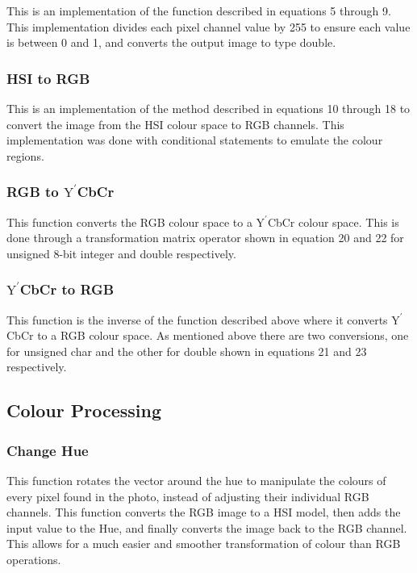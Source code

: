 \documentclass{article}
\begin{document}
	This is an implementation of the function described in equations 5 through 9. This implementation divides each pixel channel value by 255 to ensure each value is between 0 and 1, and converts the output image to type double.

	\subsubsection{HSI to RGB}
		
	This is an implementation of the method described in equations 10 through 18 to convert the image from the HSI colour space to RGB channels. This implementation was done with conditional statements to emulate the colour regions.\\
	
	\subsubsection{RGB to $\textrm{Y}^\prime$CbCr}
	
	This function converts the RGB colour space to a $\textrm{Y}^\prime$CbCr colour space. This is done through a transformation matrix operator shown in equation 20 and 22 for unsigned 8-bit integer and double respectively.\\
	
	\subsubsection{$\textrm{Y}^\prime$CbCr to RGB}
	
	This function is the inverse of the function described above where it converts $\textrm{Y}^\prime$CbCr to a RGB colour space. As mentioned above there are two conversions, one for unsigned char and the other for double shown in equations 21 and 23 respectively.\\
	
	
	
	\subsection{Colour Processing}
	
	
	\subsubsection{Change Hue}
	
	This function rotates the vector around the hue to manipulate the colours of every pixel found in the photo, instead of adjusting their individual RGB channels. This function converts the RGB image to a HSI model, then adds the input value to the Hue, and finally converts the image back to the RGB channel. This allows for a much easier and smoother transformation of colour than RGB operations.\\
	
\end{document}

